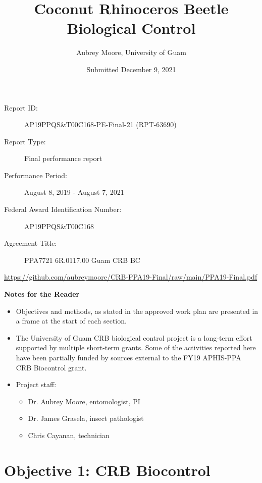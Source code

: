 \documentclass[12pt,letterpaper,english,bibliography=totocnumbered,abstract=on]{scrartcl}
\begin{document}
\titlehead{USDA-APHIS Final Report}
\title{Coconut Rhinoceros Beetle Biological Control}
\author{Aubrey Moore, University of Guam}
\date{Submitted December 9, 2021}
\maketitle
\begin{description}	
	\item[Report ID:] AP19PPQS\&T00C168-PE-Final-21 (RPT-63690)
	\item[Report Type:] Final performance report
	\item[Performance Period:] August 8, 2019 - August 7, 2021
	\item[Federal Award Identification Number:] AP19PPQS\&T00C168
	\item[Agreement Title:] PPA7721 6R.0117.00 Guam CRB BC
\end{description}

\begin{footnotesize}
\url{https://github.com/aubreymoore/CRB-PPA19-Final/raw/main/PPA19-Final.pdf}
\end{footnotesize}

\newpage{}
\tableofcontents{}

\listoftodos

\clearpage
\textbf{Notes for the Reader}
\begin{itemize}	
	\item Objectives and methods, as stated in the approved work plan \cite{mooreWorkPlanAPHISPPA2020} are presented in a frame at the start of each section. 	
	\item The University of Guam CRB biological control project is a long-term effort supported by multiple short-term grants. Some of the activities reported here have been partially funded by sources external to the FY19 APHIS-PPA CRB Biocontrol grant. 
	\item Project staff:
	\begin{itemize}
		\item Dr. Aubrey Moore, entomologist, PI
		\item Dr. James Grasela, insect pathologist
		\item Chris Cayanan, technician	
	\end{itemize}
\end{itemize}


\newpage

\section{Objective 1: CRB Biocontrol}
\end{document}
